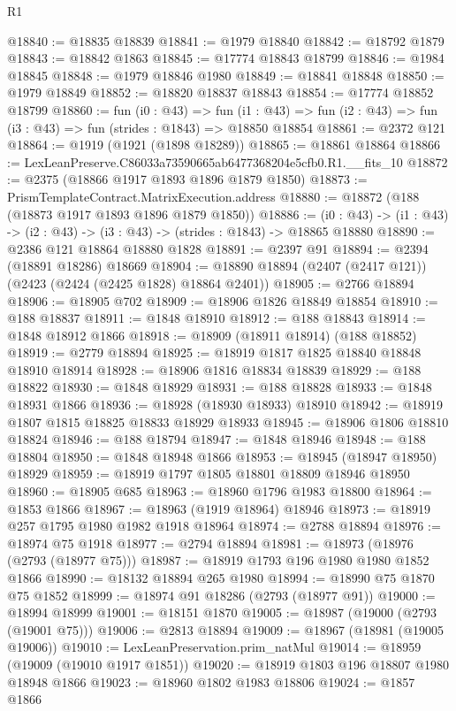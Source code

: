 \begin{lexlean}{R1}
\begin{coremodule}
@18840 := @18835 @18839
@18841 := @1979 @18840
@18842 := @18792 @1879
@18843 := @18842 @1863
@18845 := @17774 @18843 @18799
@18846 := @1984 @18845
@18848 := @1979 @18846 @1980
@18849 := @18841 @18848
@18850 := @1979 @18849
@18852 := @18820 @18837 @18843
@18854 := @17774 @18852 @18799
@18860 := fun (i0 : @43) =>
  fun (i1 : @43) => fun (i2 : @43) => fun (i3 : @43) => fun (strides : @1843) => @18850 @18854
@18861 := @2372 @121
@18864 := @1919 (@1921 (@1898 @18289))
@18865 := @18861 @18864
@18866 := LexLeanPreserve.C86033a73590665ab6477368204e5cfb0.R1.__fits_10
@18872 := @2375 (@18866 @1917 @1893 @1896 @1879 @1850)
@18873 := PrismTemplateContract.MatrixExecution.address
@18880 := @18872 (@188 (@18873 @1917 @1893 @1896 @1879 @1850))
@18886 := (i0 : @43) -> (i1 : @43) -> (i2 : @43) -> (i3 : @43) -> (strides : @1843) -> @18865 @18880
@18890 := @2386 @121 @18864 @18880 @1828
@18891 := @2397 @91
@18894 := @2394 (@18891 @18286) @18669
@18904 := @18890 @18894 (@2407 (@2417 @121)) (@2423 (@2424 (@2425 @1828) @18864 @2401))
@18905 := @2766 @18894
@18906 := @18905 @702
@18909 := @18906 @1826 @18849 @18854
@18910 := @188 @18837
@18911 := @1848 @18910
@18912 := @188 @18843
@18914 := @1848 @18912 @1866
@18918 := @18909 (@18911 @18914) (@188 @18852)
@18919 := @2779 @18894
@18925 := @18919 @1817 @1825 @18840 @18848 @18910 @18914
@18928 := @18906 @1816 @18834 @18839
@18929 := @188 @18822
@18930 := @1848 @18929
@18931 := @188 @18828
@18933 := @1848 @18931 @1866
@18936 := @18928 (@18930 @18933) @18910
@18942 := @18919 @1807 @1815 @18825 @18833 @18929 @18933
@18945 := @18906 @1806 @18810 @18824
@18946 := @188 @18794
@18947 := @1848 @18946
@18948 := @188 @18804
@18950 := @1848 @18948 @1866
@18953 := @18945 (@18947 @18950) @18929
@18959 := @18919 @1797 @1805 @18801 @18809 @18946 @18950
@18960 := @18905 @685
@18963 := @18960 @1796 @1983 @18800
@18964 := @1853 @1866
@18967 := @18963 (@1919 @18964) @18946
@18973 := @18919 @257 @1795 @1980 @1982 @1918 @18964
@18974 := @2788 @18894
@18976 := @18974 @75 @1918
@18977 := @2794 @18894
@18981 := @18973 (@18976 (@2793 (@18977 @75)))
@18987 := @18919 @1793 @196 @1980 @1980 @1852 @1866
@18990 := @18132 @18894 @265 @1980
@18994 := @18990 @75 @1870 @75 @1852
@18999 := @18974 @91 @18286 (@2793 (@18977 @91))
@19000 := @18994 @18999
@19001 := @18151 @1870
@19005 := @18987 (@19000 (@2793 (@19001 @75)))
@19006 := @2813 @18894
@19009 := @18967 (@18981 (@19005 @19006))
@19010 := LexLeanPreservation.prim_natMul
@19014 := @18959 (@19009 (@19010 @1917 @1851))
@19020 := @18919 @1803 @196 @18807 @1980 @18948 @1866
@19023 := @18960 @1802 @1983 @18806
@19024 := @1857 @1866

\end{coremodule}
\end{lexlean}
